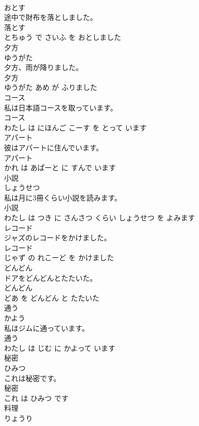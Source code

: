 \documentclass[8pt]{extreport}
\begin{document}
\begin{CJK}{UTF8}{min}
\\	おとす			
\\	途中で財布を落としました。	
\\	落とす 
\\	とちゅう で さいふ を おとしました			
\\	夕方	
\\	ゆうがた			
\\	夕方、雨が降りました。	
\\	夕方 
\\	ゆうがた あめ が ふりました			
\\	コース	
\\	私は日本語コースを取っています。	
\\	コース 
\\	わたし は にほんご こーす を とって います			
\\	アパート	
\\	彼はアパートに住んでいます。	
\\	アパート 
\\	かれ は あぱーと に すんで います			
\\	小説	
\\	しょうせつ			
\\	私は月に3冊くらい小説を読みます。	
\\	小説 
\\	わたし は つき に さんさつ くらい しょうせつ を よみます			
\\	レコード	
\\	ジャズのレコードをかけました。	
\\	レコード 
\\	じゃず の れこーど を かけました			
\\	どんどん	
\\	ドアをどんどんとたたいた。	
\\	どんどん 
\\	どあ を どんどん と たたいた			
\\	通う	
\\	かよう			
\\	私はジムに通っています。	
\\	通う 
\\	わたし は じむ に かよって います			
\\	秘密	
\\	ひみつ			
\\	これは秘密です。	
\\	秘密 
\\	これ は ひみつ です			
\\	料理	
\\	りょうり			

\end{CJK}
\end{document}
